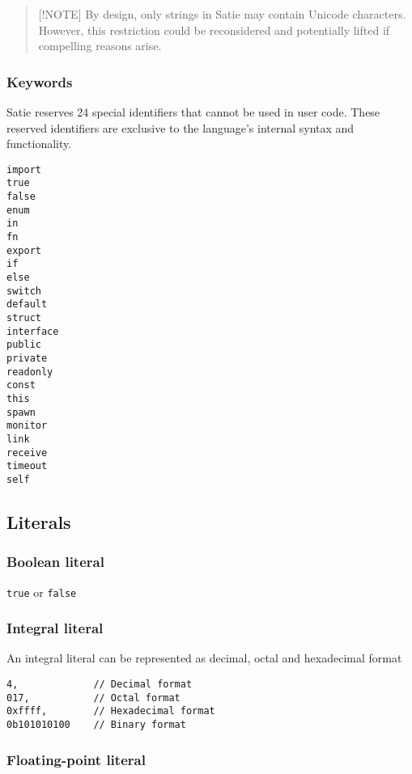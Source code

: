 \begin{quote}
{[}!NOTE{]} By design, only strings in Satie may contain Unicode
characters. However, this restriction could be reconsidered and
potentially lifted if compelling reasons arise.
\end{quote}

\hypertarget{keywords}{%
\subsubsection{Keywords}\label{keywords}}

Satie reserves 24 special identifiers that cannot be used in user code.
These reserved identifiers are exclusive to the language's internal
syntax and functionality.

\begin{verbatim}
import
true
false
enum
in
fn
export
if
else
switch
default
struct
interface
public
private
readonly
const
this
spawn
monitor
link
receive
timeout
self
\end{verbatim}

\hypertarget{literals}{%
\subsection{Literals}\label{literals}}

\hypertarget{boolean-literal}{%
\subsubsection{Boolean literal}\label{boolean-literal}}

\texttt{true} or \texttt{false}

\hypertarget{integral-literal}{%
\subsubsection{Integral literal}\label{integral-literal}}

An integral literal can be represented as decimal, octal and hexadecimal
format

\begin{verbatim}
4,             // Decimal format
017,           // Octal format
0xffff,        // Hexadecimal format
0b101010100    // Binary format
\end{verbatim}

\hypertarget{floating-point-literal}{%
\subsubsection{Floating-point literal}\label{floating-point-literal}}

